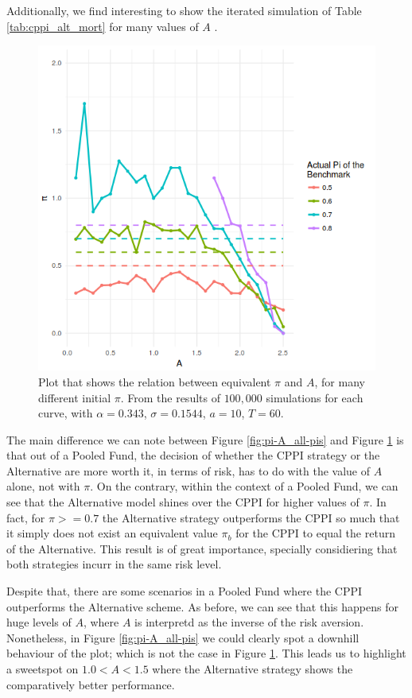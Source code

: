 Additionally, we find interesting to show the iterated simulation of Table \ref{tab:cppi_alt_mort} for many values of $A$ .

\begin{figure}[h]
    \centering
    \includegraphics[scale=0.75]{./images/pi-A_mort_2.png}
    \caption{Plot that shows the relation between equivalent $\pi$ and $A$, for many different initial $\pi$. From the results of $100,000$ simulations for each curve, with $\alpha = 0.343$, $\sigma = 0.1544$, $a = 10$, $T = 60$.}
    \label{fig:pi-a_mort}
\end{figure}

The main difference we can note between Figure \ref{fig:pi-A_all-pis} and Figure \ref{fig:pi-a_mort} is that out of a Pooled Fund, the decision of whether the CPPI strategy or the Alternative are more worth it, in terms of risk, has to do with the value of $A$ alone, not with $\pi$. On the contrary, within the context of a Pooled Fund, we can see that the Alternative model shines over the CPPI for higher values of $\pi$. In fact, for $\pi >= 0.7$ the Alternative strategy outperforms the CPPI so much that it simply does not exist an equivalent value $\pi_b$ for the CPPI to equal the return of the Alternative. This result is of great importance, specially considiering that both strategies incurr in the same risk level.

Despite that, there are some scenarios in a Pooled Fund where the CPPI outperforms the Alternative scheme. As before, we can see that this happens for huge levels of $A$, where $A$ is interpretd as the inverse of the risk aversion. Nonetheless, in Figure \ref{fig:pi-A_all-pis} we could clearly spot a downhill behaviour of the plot; which is not the case in Figure \ref{fig:pi-a_mort}. This leads us to highlight a sweetspot on $1.0 < A < 1.5$ where the Alternative strategy shows the comparatively better performance.




